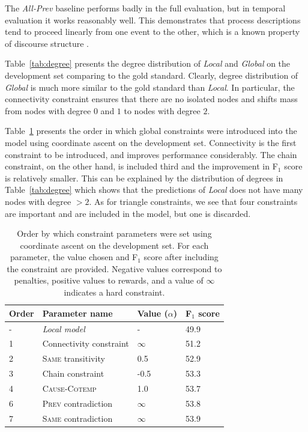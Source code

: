 The \emph{All-Prev} baseline performs badly in the full evaluation, but in temporal evaluation it works reasonably well. This demonstrates that process descriptions tend to proceed linearly from one event to the other, which is a known property of discourse structure \cite{schegloff73}.

Table~\ref{tab:degree} presents the degree distribution of \emph{Local} and \emph{Global} on the development set comparing to the gold standard. Clearly, degree distribution of \emph{Global} is much more similar to the gold standard than \emph{Local}. In particular, the connectivity constraint ensures that there are no isolated nodes and shifts mass from nodes with degree $0$ and $1$ to nodes with degree $2$.

Table~\ref{tab:paramtuning} presents the order in which global constraints were introduced into the model using coordinate ascent on the development set. Connectivity is the first constraint to be introduced, and improves performance considerably. The chain constraint, on the other hand, is included third and the improvement in F$_{1}$ score is relatively smaller. This can be explained by the distribution of degrees in Table~\ref{tab:degree} which shows that the predictions of \emph{Local} does not have many nodes with degree $>2$. As for triangle constraints, we see that four constraints are important and are included in the model, but one is discarded.

\begin{table}[t]
{\footnotesize
\begin{tabular}{ l | l | l | l }
    \textbf{Order} & \textbf{Parameter name} & \textbf{Value} ($\alpha$)& \textbf{F$_1$ score} \\
\hline
- & \emph{Local model} & - & 49.9 \\
1 & Connectivity constraint & $\infty$ & 51.2 \\
2 & \textsc{Same} transitivity &  0.5 & 52.9 \\
3 & Chain constraint & -0.5 & 53.3\\
4 & \textsc{Cause}-\textsc{Cotemp} & 1.0 & 53.7\\
6 & \textsc{Prev} contradiction & $\infty$ & 53.8\\
7 & \textsc{Same} contradiction & $\infty$ & 53.9
\end{tabular}}
\caption{Order by which constraint parameters were set using coordinate ascent on the development set. For each parameter, the value chosen and F$_1$ score after including the constraint are provided. Negative values correspond to penalties, positive values to rewards, and a value of $\infty$ indicates a hard constraint.}
\label{tab:paramtuning}
\end{table}

